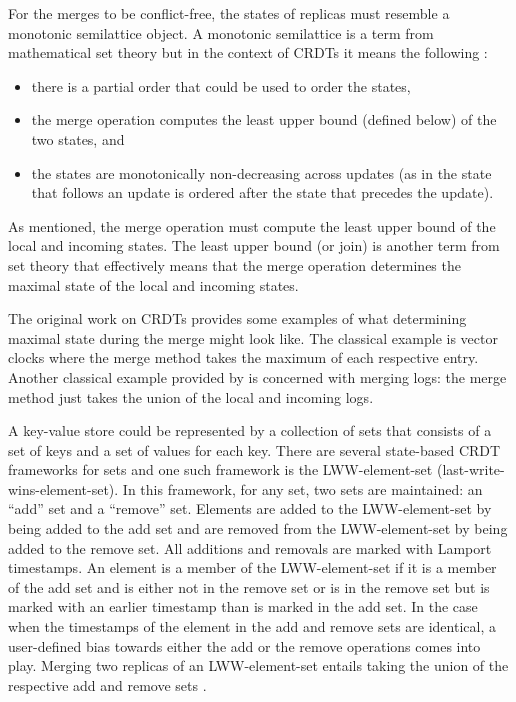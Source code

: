 \documentclass[sigconf,nonacm,11pt]{acmart}
\begin{document}
For the merges to be conflict-free, the states of replicas must resemble a monotonic semilattice object. A monotonic semilattice is a term from mathematical set theory \cite{Davey:Lattices} but in the context of CRDTs it means the following \cite{shapiro2011conflict}:
\begin{itemize}
 \item there is a partial order that could be used to order the states,
 \item the merge operation computes the least upper bound (defined below) of the two states, and
 \item the states are monotonically non-decreasing across updates (as in the state that follows an update is ordered after the state that precedes the update).
\end{itemize}

As mentioned, the merge operation must compute the least upper bound of the local and incoming states. The least upper bound (or join) is another term from set theory \cite{Davey:Lattices} that effectively means that the merge operation determines the maximal state of the local and incoming states.

The original work on CRDTs \cite{shapiro2011conflict} provides some examples of what determining maximal state during the merge might look like. The classical example is vector clocks where the merge method takes the maximum of each respective entry. Another classical example provided by \cite{shapiro2011conflict} is concerned with merging logs: the merge method just takes the union of the local and incoming logs.

A key-value store could be represented by a collection of sets that consists of a set of keys and a set of values for each key. There are several state-based CRDT frameworks for sets and one such framework is the LWW-element-set (last-write-wins-element-set). In this framework, for any set, two sets are maintained: an ``add'' set and a ``remove'' set. Elements are added to the LWW-element-set by being added to the add set and are removed from the LWW-element-set by being added to the remove set. All additions and removals are marked with Lamport timestamps. An element is a member of the LWW-element-set if it is a member of the add set and is either not in the remove set or is in the remove set but is marked with an earlier timestamp than is marked in the add set. In the case when the timestamps of the element in the add and remove sets are identical, a user-defined bias towards either the add or the remove operations comes into play. Merging two replicas of an LWW-element-set entails taking the union of the respective add and remove sets \cite{shapiro2011comprehensive}.
\end{document}
